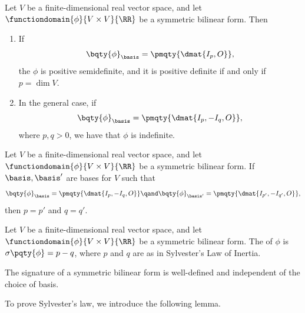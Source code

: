 \begin{example}
    Let \(V\) be a finite-dimensional real vector space, and let \(\functiondomain{\phi}{V \times V}{\RR}\) be a symmetric bilinear form. Then
    \begin{enumerate}[label=(\roman*)]
        \item If
        \[
            \bqty{\phi}_{\basis} = \pmqty{\dmat{I_p, O}},
        \]
        the \(\phi\) is positive semidefinite, and it is positive definite if and only if \(p = \dim V\).
        \item In the general case, if
        \[
            \bqty{\phi}_{\basis} = \pmqty{\dmat{I_p, -I_q, O}},
        \]
        where \(p, q > 0\), we have that \(\phi\) is indefinite.
    \end{enumerate}
\end{example}

\begin{theorem}
    \label{thm:sylvesters-law-of-inertia}%
    Let \(V\) be a finite-dimensional real vector space, and let \(\functiondomain{\phi}{V \times V}{\RR}\) be a symmetric bilinear form. If \(\basis, \basis'\) are bases for \(V\) such that
    \[
        \bqty{\phi}_{\basis} = \pmqty{\dmat{I_p, -I_q, O}} \qand \bqty{\phi}_{\basis'} = \pmqty{\dmat{I_{p'}, -I_{q'}, O}},
    \]
    then \(p = p'\) and \(q = q'\).
\end{theorem}

\begin{definition}
    Let \(V\) be a finite-dimensional real vector space, and let \(\functiondomain{\phi}{V \times V}{\RR}\) be a symmetric bilinear form. The  of \(\phi\) is \(\sigma\pqty{\phi} = p - q\), where \(p\) and \(q\) are as in Sylvester's Law of Inertia.
\end{definition}

\begin{corollary}
    The signature of a symmetric bilinear form is well-defined and independent of the choice of basis.
\end{corollary}

To prove Sylvester's law, we introduce the following lemma.


